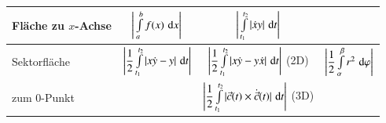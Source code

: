 {\begin{tabular}{| l | c | c | c |}
	Fläche zu $x$-Achse & $\Bigg| \int \limits_{a}^{b} f(x) \, \mathop{} \! \mathrm{d} x \Bigg|$ 															& $\Bigg| \int \limits_{t_1}^{t_2} | \dot{x} y |  \,  \mathop{} \! \mathrm{d} t \Bigg|$  									& 																						\\
	\hline
	Sektorfläche   		& $\Bigg| \dfrac{1}{2} \int \limits_{t_1}^{t_2} |x \dot{y} - y | \, \mathop{} \! \mathrm{d} t \Bigg|$ 															& $\Bigg| \dfrac{1}{2} \int \limits_{t_1}^{t_2} |x \dot{y} - y \dot{x}| \, \mathop{} \! \mathrm{d} t \Bigg|$ \quad (2D) 									& $\Bigg| \dfrac{1}{2} \int \limits_{\alpha}^{\beta} r^2 \, \mathop{} \! \mathrm{d} \varphi \Bigg|$															\\
	zum $0$-Punkt       & 																												& $\Bigg| \dfrac{1}{2} \int \limits_{t_1}^{t_2} \vert \vec{c}(t) \times \dot{\vec{c}}(t) \vert \, \mathop{} \! \mathrm{d} t \Bigg|$ \quad (3D)			& 																																											\\


\end{tabular}}
